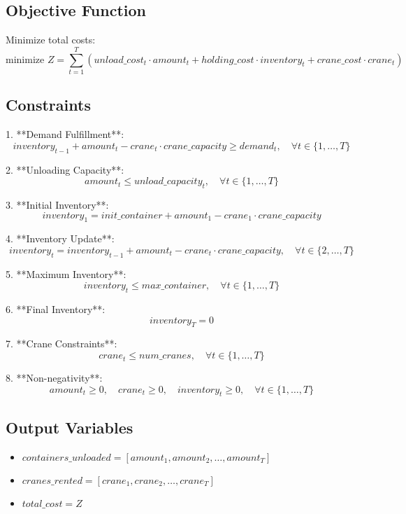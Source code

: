 \documentclass{article}
\begin{document}
\subsection*{Objective Function}
Minimize total costs:
\[
\text{minimize } Z = \sum_{t=1}^{T} (unload\_cost_{t} \cdot amount_{t} + holding\_cost \cdot inventory_{t} + crane\_cost \cdot crane_{t})
\]

\subsection*{Constraints}

1. **Demand Fulfillment**:
\[
inventory_{t-1} + amount_{t} - crane_{t} \cdot crane\_capacity \geq demand_{t}, \quad \forall t \in \{1, \ldots, T\}
\]

2. **Unloading Capacity**:
\[
amount_{t} \leq unload\_capacity_{t}, \quad \forall t \in \{1, \ldots, T\}
\]

3. **Initial Inventory**:
\[
inventory_{1} = init\_container + amount_{1} - crane_{1} \cdot crane\_capacity
\]

4. **Inventory Update**:
\[
inventory_{t} = inventory_{t-1} + amount_{t} - crane_{t} \cdot crane\_capacity, \quad \forall t \in \{2, \ldots, T\}
\]

5. **Maximum Inventory**:
\[
inventory_{t} \leq max\_container, \quad \forall t \in \{1, \ldots, T\}
\]

6. **Final Inventory**:
\[
inventory_{T} = 0
\]

7. **Crane Constraints**:
\[
crane_{t} \leq num\_cranes, \quad \forall t \in \{1, \ldots, T\}
\]

8. **Non-negativity**:
\[
amount_{t} \geq 0, \quad crane_{t} \geq 0, \quad inventory_{t} \geq 0, \quad \forall t \in \{1, \ldots, T\}
\]

\subsection*{Output Variables}
\begin{itemize}
    \item $containers\_unloaded = [amount_{1}, amount_{2}, \ldots, amount_{T}]$
    \item $cranes\_rented = [crane_{1}, crane_{2}, \ldots, crane_{T}]$
    \item $total\_cost = Z$
\end{itemize}
\end{document}
